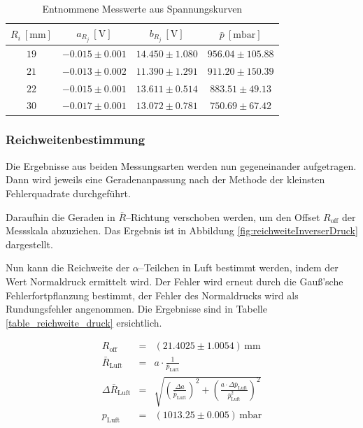 \documentclass[12pt,a4paper]{scrartcl}
\numberwithin{equation}{section} %
\begin{document}
\begin{table}[H]
	\centering
	\begin{tabular}{||c|c|c|c||}
		\hline
		$R_i\ [\mathrm{mm}]$
			& $a_{R_j}\ [\mathrm{V}]$
			& $b_{R_j}\ [\mathrm{V}]$
			& $\bar{p}\ [\mathrm{mbar}]$ \\
		\hline \hline
		$19$
			& $-0.015 \pm 0.001$
			& $14.450 \pm 1.080$
			& $956.04 \pm 105.88$ \\
		\hline
		$21$
			& $-0.013 \pm 0.002$
			& $11.390 \pm 1.291$
			& $911.20 \pm 150.39$ \\
		\hline
		$22$
			& $-0.015 \pm 0.001$
			& $13.611 \pm 0.514$
			& $883.51 \pm 49.13$ \\
		\hline
		$30$
			& $-0.017 \pm 0.001$
			& $13.072 \pm 0.781$
			& $750.69 \pm 67.42$ \\
		\hline
	\end{tabular}
	\caption{Entnommene Messwerte aus Spannungskurven}
	\label{table_messwerte_spannung}
\end{table}

\hypertarget{Reichweite-Ergebnisse}{%
	\subsubsection{Reichweitenbestimmung}\label{Reichweite-Ergebnisse}}

Die Ergebnisse aus beiden Messungsarten werden nun gegeneinander aufgetragen. Dann wird jeweils eine Geradenanpassung nach der Methode der kleinsten Fehlerquadrate durchgeführt.

Daraufhin die Geraden in $\bar R$--Richtung verschoben werden, um den Offset $R_\mathrm{off}$ der Messskala abzuziehen. Das Ergebnis ist in Abbildung \ref{fig:reichweiteInverserDruck} dargestellt.

Nun kann die Reichweite der $\alpha$--Teilchen in Luft bestimmt werden, indem der Wert Normaldruck ermittelt wird. Der Fehler wird erneut durch die Gauß'sche Fehlerfortpflanzung bestimmt, der Fehler des Normaldrucks wird als Rundungsfehler angenommen. Die Ergebnisse sind in Tabelle \ref{table_reichweite_druck} ersichtlich.

\begin{eqnarray}
	R_\mathrm{off} &=& (21.4025 \pm 1.0054) \mathrm{\,mm} \\
	\bar{R}_\mathrm{Luft} &=& a \cdot \frac{1}{\bar{p}_\mathrm{Luft}} \\
	\Delta \bar{R}_\mathrm{Luft} &=& \sqrt{\left(\frac{\Delta a}{\bar{p}_\mathrm{Luft}}\right)^2 + \left(\frac{a \cdot \Delta \bar{p}_\mathrm{Luft}}{\bar{p}_\mathrm{Luft}^2}\right)^2} \label{eq:Reichweite Luft} \\
	p_\mathrm{Luft} &=&(1013.25 \pm 0.005) \mathrm{\, mbar}
\end{eqnarray}
\end{document}
